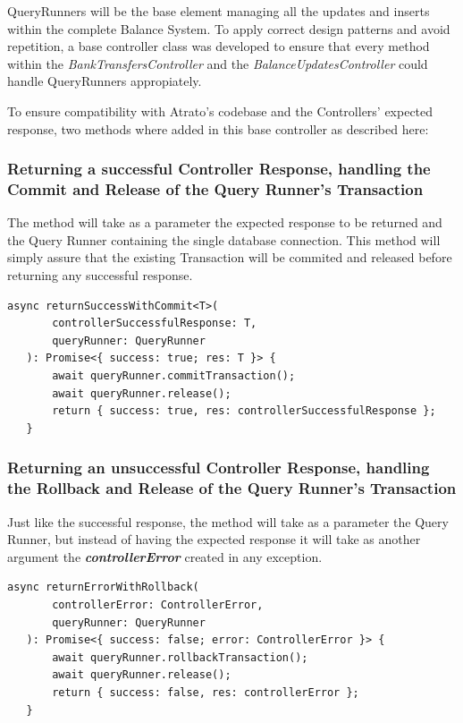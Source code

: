 QueryRunners will be the base element managing all the updates and inserts within the complete Balance System. To apply correct design patterns and avoid repetition, a base controller class was developed to ensure that every method within the \textit{BankTransfersController} and the \textit{BalanceUpdatesController} could handle QueryRunners appropiately.

To ensure compatibility with Atrato's codebase and the Controllers' expected response, two methods where added in this base controller as described here: 

\subsubsection{Returning a successful Controller Response, handling the Commit and Release of the Query Runner's Transaction}

The method will take as a parameter the expected response to be returned and the Query Runner containing the single database connection. This method will simply assure that the existing Transaction will be commited and released before returning any successful response.

\begin{verbatim}
async returnSuccessWithCommit<T>(
       controllerSuccessfulResponse: T,
       queryRunner: QueryRunner
   ): Promise<{ success: true; res: T }> {
       await queryRunner.commitTransaction();
       await queryRunner.release();
       return { success: true, res: controllerSuccessfulResponse };
   }
\end{verbatim}

\subsubsection{Returning an unsuccessful Controller Response, handling the Rollback and Release of the Query Runner's Transaction}


Just like the successful response, the method will take as a parameter the Query Runner, but instead of having the expected response it will take as another argument the \textbf{\textit{controllerError}} created in any exception.

\begin{verbatim}
async returnErrorWithRollback(
       controllerError: ControllerError,
       queryRunner: QueryRunner
   ): Promise<{ success: false; error: ControllerError }> {
       await queryRunner.rollbackTransaction();
       await queryRunner.release();
       return { success: false, res: controllerError };
   }
\end{verbatim}


